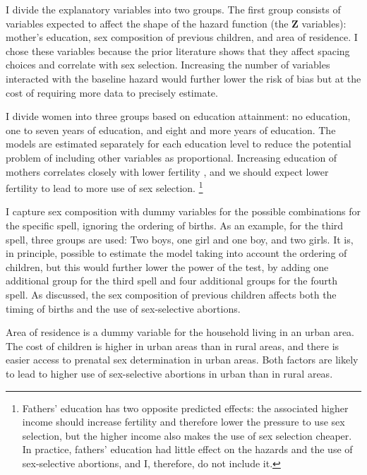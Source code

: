 \documentclass[12pt,letterpaper]{article}
\begin{document}
I divide the explanatory variables into two groups.
The first group consists of variables expected to affect the shape of the hazard function
(the $\mathbf{Z}$ variables): 
mother's education, sex composition of previous children, and area of residence.
I chose these variables because the prior literature shows that they affect 
spacing choices and correlate with sex selection.
Increasing the number of variables interacted with the baseline hazard would
further lower the risk of bias but at the cost of requiring more data to 
precisely estimate.

I divide women into three groups based on education attainment: no
education, one to seven years of education, and eight and more years of education.
The models are estimated separately for each education level to reduce
the potential problem of including other variables as proportional.
Increasing education of mothers correlates closely with lower fertility 
\citep{schultz97}, and 
we should expect lower fertility to lead to more use of sex selection.%
\footnote{
Fathers' education has two opposite predicted effects: the associated higher income
should increase fertility and therefore lower the pressure to use sex selection, but
the higher income also makes the use of sex selection cheaper.
In practice, fathers' education had little effect on the hazards and the use of 
sex-selective abortions, and I, therefore, do not include it.
}

I capture sex composition with dummy variables for the
possible combinations for the specific spell, ignoring the ordering of births.
As an example, for the third spell, three groups are used: Two boys,
one girl and one boy, and two girls.
It is, in principle, possible to estimate the model taking into account
the ordering of children, but this would further lower the power of the
test, by adding one additional group for the third spell and four
additional groups for the fourth spell. 
As discussed, the sex composition of previous children affects both the timing
of births and the use of sex-selective abortions.

Area of residence is a dummy variable for the household living in
an urban area.
The cost of children is higher in urban areas than in rural areas, and 
there is easier access to prenatal sex determination in urban areas.
Both factors are likely to lead to higher use of sex-selective abortions
in urban than in rural areas.
\end{document}

